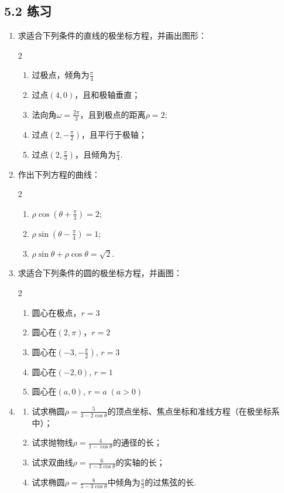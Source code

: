\subsection*{5.2 练习}
\begin{enumerate}
    \item 求适合下列条件的直线的极坐标方程，并画出图形：
\begin{multicols}{2}
    \begin{enumerate}[(1)]
    \item 过极点，倾角为$\frac{\pi}{4}$
    \item 过点$(4,0)$，且和极轴垂直；
    \item 法向角$\omega=\frac{2\pi}{3}$，且到极点的距离$\rho=2$;
    \item 过点$\left(2,-\frac{\pi}{2}\right)$，且平行于极轴；
    \item 过点$\left(2,\frac{\pi}{3}\right)$，且倾角为$\frac{\pi}{4}$.  
    \end{enumerate}    
\end{multicols}


    \item 作出下列方程的曲线：
\begin{multicols}{2}
 \begin{enumerate}[(1)]
    \item $\rho\cos\left(\theta+\frac{\pi}{3}\right)=2$;
    \item $\rho\sin\left(\theta-\frac{\pi}{4}\right)=1$;
    \item $\rho\sin\theta+\rho\cos\theta=\sqrt{2}$.
\end{enumerate}   
\end{multicols}

    \item 求适合下列条件的圆的极坐标方程，并画图：
\begin{multicols}{2}
\begin{enumerate}[(1)]
    \item 圆心在极点，$r=3$
    \item   圆心在$(2,\pi)$，$r=2$
    \item  圆心在$\left(-3,-\frac{\pi}{2}\right)$, $r=3$
    \item  圆心在$(-2,0)$, $r=1$
    \item  圆心在$(a,0)$, $r=a\; (a>0)$
\end{enumerate}
\end{multicols}

 \item \begin{enumerate}[(1)]
     \item 试求椭圆$\rho=\frac{5}{3-2\cos\theta}$的顶点坐标、焦点坐标和准线方程（在极坐标系中）；
     \item  试求抛物线$\rho=\frac{4}{1-\cos\theta}$的通径的长；
     \item  试求双曲线$\rho=\frac{6}{1-3\cos\theta}$的实轴的长；
      \item  试求椭圆$\rho=\frac{8}{5-3\cos\theta}$中倾角为$\frac{\pi}{3}$的过焦弦的长.
  \end{enumerate}    


\end{enumerate}
